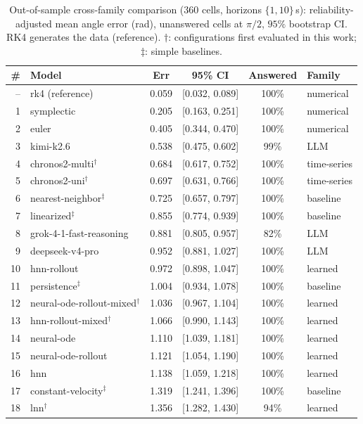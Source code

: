 \documentclass{article}
\begin{document}
\begin{table}[tbp]
\centering\footnotesize\renewcommand{\arraystretch}{0.90}
\caption{Out-of-sample cross-family comparison ($360$ cells, horizons $\{1,10\}$\,s):
reliability-adjusted mean angle error (rad), unanswered cells at $\pi/2$, $95\%$ bootstrap CI.
RK4 generates the data (reference). $\dagger$: configurations first evaluated in this work;
$\ddagger$: simple baselines.}\label{tab:overall}
\begin{tabular}{rlcccl}
\toprule
\# & Model & Err & 95\% CI & Answered & Family \\
\midrule
-- & rk4 (reference) & 0.059 & [0.032, 0.089] & 100\% & numerical \\
1 & symplectic & 0.205 & [0.163, 0.251] & 100\% & numerical \\
2 & euler & 0.405 & [0.344, 0.470] & 100\% & numerical \\
3 & kimi-k2.6 & 0.538 & [0.475, 0.602] & 99\% & LLM \\
4 & chronos2-multi$^\dagger$ & 0.684 & [0.617, 0.752] & 100\% & time-series \\
5 & chronos2-uni$^\dagger$ & 0.697 & [0.631, 0.766] & 100\% & time-series \\
6 & nearest-neighbor$^\ddagger$ & 0.725 & [0.657, 0.797] & 100\% & baseline \\
7 & linearized$^\ddagger$ & 0.855 & [0.774, 0.939] & 100\% & baseline \\
8 & grok-4-1-fast-reasoning & 0.881 & [0.805, 0.957] & 82\% & LLM \\
9 & deepseek-v4-pro & 0.952 & [0.881, 1.027] & 100\% & LLM \\
10 & hnn-rollout & 0.972 & [0.898, 1.047] & 100\% & learned \\
11 & persistence$^\ddagger$ & 1.004 & [0.934, 1.078] & 100\% & baseline \\
12 & neural-ode-rollout-mixed$^\dagger$ & 1.036 & [0.967, 1.104] & 100\% & learned \\
13 & hnn-rollout-mixed$^\dagger$ & 1.066 & [0.990, 1.143] & 100\% & learned \\
14 & neural-ode & 1.110 & [1.039, 1.181] & 100\% & learned \\
15 & neural-ode-rollout & 1.121 & [1.054, 1.190] & 100\% & learned \\
16 & hnn & 1.138 & [1.059, 1.218] & 100\% & learned \\
17 & constant-velocity$^\ddagger$ & 1.319 & [1.241, 1.396] & 100\% & baseline \\
18 & lnn$^\dagger$ & 1.356 & [1.282, 1.430] & 94\% & learned \\
\bottomrule
\end{tabular}
\end{table}
\end{document}
